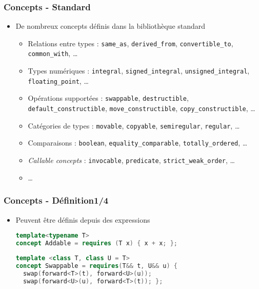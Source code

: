 \documentclass[C++.tex]{subfiles}
\begin{document}
\begin{frame}[fragile]
	\frametitle{Concepts - Standard}
	\begin{itemize}
		\item De nombreux concepts définis dans la bibliothèque standard


		\begin{itemize}
			\item Relations entre types : \lstinline|same_as|, \lstinline|derived_from|, \lstinline|convertible_to|, \lstinline|common_with|, \ldots
			\item Types numériques : \lstinline|integral|, \lstinline|signed_integral|, \lstinline|unsigned_integral|, \lstinline|floating_point|, \ldots
			\item Opérations supportées : \lstinline|swappable|, \lstinline|destructible|, \lstinline|default_constructible|, \lstinline|move_constructible|, \lstinline|copy_constructible|, \ldots
			\item Catégories de types : \lstinline|movable|, \lstinline|copyable|, \lstinline|semiregular|, \lstinline|regular|, \ldots


			\item Comparaisons : \lstinline|boolean|, \lstinline|equality_comparable|, \lstinline|totally_ordered|, \ldots
			\item \textit{Callable concepts} : \lstinline|invocable|, \lstinline|predicate|, \lstinline|strict_weak_order|, \ldots


			\item \ldots
		\end{itemize}
	\end{itemize}
\end{frame}

\begin{frame}[fragile]
	\frametitle{Concepts - Définition\titlehfill{}1/4}
	\begin{itemize}
		\item Peuvent être définis depuis des expressions

		\begin{lstlisting}[language=C++]
template<typename T>
concept Addable = requires (T x) { x + x; };\end{lstlisting}

		\begin{lstlisting}[language=C++]
template <class T, class U = T>
concept Swappable = requires(T&& t, U&& u) {
  swap(forward<T>(t), forward<U>(u));
  swap(forward<U>(u), forward<T>(t)); };\end{lstlisting}

	\end{itemize}
\end{frame}
\end{document}
